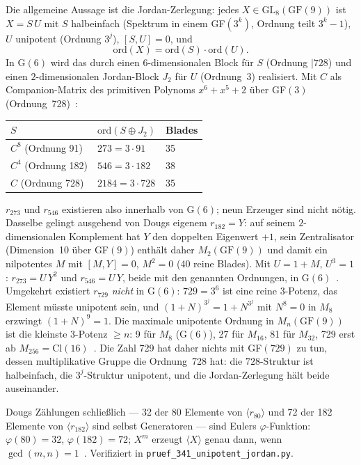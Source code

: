 Die allgemeine Aussage ist die Jordan-Zerlegung: jedes $X\in\mathrm{GL}_8(\text{GF}(9))$
ist $X=S\,U$ mit $S$ halbeinfach (Spektrum in einem GF$(3^k)$, Ordnung teilt $3^k-1$),
$U$ unipotent (Ordnung $3^j$), $[S,U]=0$, und
\begin{equation}
  \mathrm{ord}(X)=\mathrm{ord}(S)\cdot\mathrm{ord}(U).
\end{equation}
In G$(6)$ wird das durch einen $6$-dimensionalen Block für $S$ (Ordnung $\mid 728$)
und einen $2$-dimensionalen Jordan-Block $J_2$ für $U$ (Ordnung~3) realisiert. Mit $C$
als Companion-Matrix des primitiven Polynoms $x^6+x^5+2$ über GF$(3)$ (Ordnung~728)~\BM:
\begin{center}
\begin{tabular}{lll}
\toprule
$S$ & $\mathrm{ord}(S\oplus J_2)$ & Blades \\
\midrule
$C^8$ (Ordnung 91)  & $273 = 3\cdot 91$   & 35 \\
$C^4$ (Ordnung 182) & $546 = 3\cdot 182$  & 38 \\
$C$ (Ordnung 728)   & $2184 = 3\cdot 728$ & 35 \\
\bottomrule
\end{tabular}
\end{center}
$r_{273}$ und $r_{546}$ existieren also innerhalb von G$(6)$; neun Erzeuger sind nicht nötig.
Dasselbe gelingt ausgehend von Dougs eigenem $r_{182}=Y$: auf seinem $2$-dimensionalen
Komplement hat $Y$ den doppelten Eigenwert $+1$, sein Zentralisator (Dimension~10
über GF$(9)$) enthält daher $M_2(\text{GF}(9))$ und damit ein nilpotentes $M$ mit
$[M,Y]=0$, $M^2=0$ (40 reine Blades). Mit $U=1+M$, $U^3=1$:
$r_{273}=U\,Y^2$ und $r_{546}=U\,Y$, beide mit den genannten Ordnungen, in G$(6)$~\BM.
Umgekehrt existiert $r_{729}$ \emph{nicht} in G$(6)$: $729=3^6$ ist eine reine 3-Potenz,
das Element müsste unipotent sein, und $(1+N)^{3^j}=1+N^{3^j}$ mit $N^8=0$ in $M_8$
erzwingt $(1+N)^9=1$. Die maximale unipotente Ordnung in $M_n(\text{GF}(9))$ ist die
kleinste 3-Potenz $\ge n$: 9 für $M_8$ (G$(6)$), 27 für $M_{16}$, 81 für $M_{32}$,
729 erst ab $M_{256}=\mathrm{Cl}(16)$~\BM. Die Zahl 729 hat daher nichts mit GF$(729)$
zu tun, dessen multiplikative Gruppe die Ordnung~728 hat: die $728$-Struktur ist
halbeinfach, die $3^j$-Struktur unipotent, und die Jordan-Zerlegung hält beide auseinander.

Dougs Zählungen schließlich --- 32 der 80 Elemente von $\langle r_{80}\rangle$ und 72 der
182 Elemente von $\langle r_{182}\rangle$ sind selbst Generatoren --- sind Eulers
$\varphi$-Funktion: $\varphi(80)=32$, $\varphi(182)=72$; $X^m$ erzeugt $\langle X\rangle$
genau dann, wenn $\gcd(m,n)=1$~\BM. Verifiziert in \texttt{pruef\_341\_unipotent\_jordan.py}.

